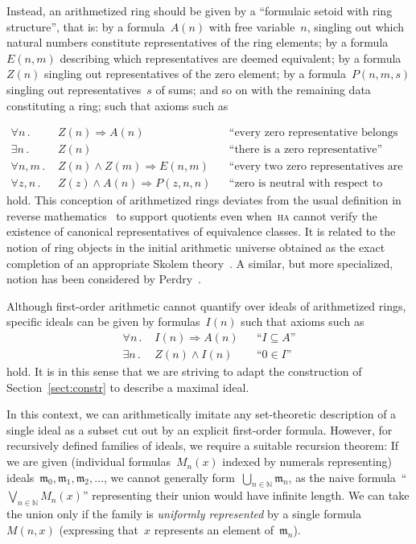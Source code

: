 \documentclass[com,11pt,crcready]{iosart2x}
\theoremstyle{definition}
\theoremstyle{plain}
\theoremstyle{remark}
\newcommand{\mmm}{\mathfrak{m}}
\newcommand{\NN}{\mathbb{N}}
\renewcommand{\_}{\mathpunct{.}\,}
\begin{document}
Instead, an arithmetized ring should be given by a ``formulaic setoid with ring
structure'', that is: by a formula~$A(n)$ with free
variable~$n$, singling out which natural numbers constitute
representatives of the ring elements; by a formula~$E(n,m)$ describing which
representatives are deemed equivalent; by a formula~$Z(n)$ singling out
representatives of the zero element; by a formula~$P(n,m,s)$ singling out
representatives~$s$ of sums; and so on with the remaining data constituting
a ring; such that axioms such as\par
{\vspace*{-1.2em}\small\begin{align*}
  \forall n\_ & Z(n) \Rightarrow A(n) && \text{``every zero representative belongs to the ring''} \\
  \exists n\_ & Z(n) && \text{``there is a zero representative''} \\
  \forall n,m\_ & Z(n) \wedge Z(m) \Longrightarrow E(n,m) && \text{``every two zero representatives are equivalent''} \\
  \forall z,n\_ & Z(z) \wedge A(n) \Longrightarrow P(z,n,n) && \text{``zero is neutral with respect to addition''}
\end{align*}}%
hold. This conception of arithmetized rings deviates from the usual definition
in reverse mathematics~\cite[Definition~III.5.1]{simpson:subsystems} to support
quotients even when~\textsc{ha} cannot verify the existence of
canonical representatives of equivalence classes. It is related to the notion
of ring objects in the initial arithmetic universe obtained as the exact
completion of an appropriate Skolem theory~\cite{maietti:au,vickers:sketches}.
A similar, but more specialized, notion has been considered by
Perdry~\cite[Section~2]{perdry:lazy}.

Although first-order arithmetic cannot quantify over ideals of arithmetized
rings, specific ideals can be given by formulas~$I(n)$ such that axioms such as
{\small\begin{align*}
  \forall n\_ & I(n) \Rightarrow A(n) && \text{``$I \subseteq A$''} \\
  \exists n\_ & Z(n) \wedge I(n) && \text{``$0 \in I$''}
\end{align*}}%
hold. It is in this sense that we are striving to adapt the construction of
Section~\ref{sect:constr} to describe a maximal ideal.

In this context, we can arithmetically imitate any set-theoretic description of
a single ideal as a subset cut out by an explicit first-order formula. However, for
recursively defined families of ideals, we require a suitable recursion
theorem: If we are given (individual formulas~$M_n(x)$ indexed by numerals
representing) ideals~$\mmm_0,\mmm_1,\mmm_2,\ldots$, we cannot generally
form~$\bigcup_{n\in\NN} \mmm_n$, as the naive formula~``$\bigvee_{n\in\NN} M_n(x)$''
representing their union would have infinite length. We can take the union only
if the family is \emph{uniformly represented} by a single formula~$M(n,x)$ (expressing
that~$x$ represents an element of~$\mmm_n$).
\end{document}
